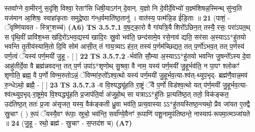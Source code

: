 \documentclass[17pt]{extarticle}
\begin{document}
                  स्तवा᳚ग्ने वा॒मीरनु॑ स॒दृंशि॒ विश्वा॒ रेताꣳ॑सि धिषी॒याऽग॑न् दे॒वान्. य॒ज्ञो नि दे॒वीर्दे॒वेभ्यो॑ य॒ज्ञ्म॑शिषन्न॒स्मिन्थ् सु॑न्व॒ति यज॑मान आ॒शिषः॒ स्वाहा॑कृताः समुद्रे॒ष्ठा ग॑न्ध॒र्वमाति॑ष्ठ॒तानु॑ । वात॑स्य॒ पत्म॑न्नि॒ड ई॑डि॒ताः ॥ \textbf{  21 } \newline
                  \newline
                      (पाशं॒ - ॅवृष्णि॑यावत - स्त्रिꣳ॒॒शच्च॑)  \textbf{(A6)} \newline \newline
                                        \textbf{ TS 3.5.7.1} \newline
                  व॒ष॒ट्का॒रो वै गा॑यत्रि॒यै शिरो᳚ऽछिन॒त् तस्यै॒ रसः॒ परा॑ऽपत॒थ् स पृ॑थि॒वीं प्रावि॑श॒थ्स ख॑दि॒रो॑ऽभव॒द्यस्य॑ खादि॒रः स्रु॒वो भव॑ति॒ छन्द॑सामे॒व रसे॒नाव॑ द्यति॒ सर॑सा अ॒स्याऽऽ*हु॑तयो भवन्ति तृ॒तीय॑स्यामि॒तो दि॒वि सोम॑ आसी॒त् तं गाय॒त्र्याऽ ह॑र॒त् तस्य॑ प॒र्णम॑च्छिद्यत॒ तत् प॒र्णो॑ऽभव॒त् तत् प॒र्णस्य॑ पर्ण॒त्वं ॅयस्य॑ पर्ण॒मयी॑ जु॒हू - [  ] \textbf{  22} \newline
                  \newline
                                \textbf{ TS 3.5.7.2} \newline
                  -र्भव॑ति सौ॒म्या अ॒स्याऽऽ*हु॑तयो भवन्ति जु॒षन्ते᳚ऽस्य दे॒वा आहु॑तीर्दे॒वा वै ब्रह्म॑न्नवदन्त॒ तत् प॒र्ण उपा॑ऽ*शृणोथ् सु॒श्रवा॒ वै नाम॒ यस्य॑ पर्ण॒मयी॑ जु॒हूर्भव॑ति॒ न पा॒पꣳ श्लोकꣳ॑ शृणोति॒ ब्रह्म॒ वै प॒र्णो विण्म॒रुतोऽन्नं॒ ॅविण्मा॑रु॒तो᳚ऽश्व॒त्थो यस्य॑ पर्ण॒मयी॑ जु॒हूर्भव॒त्या-श्व॑त्-थ्युप॒भृद्- ब्रह्म॑णै॒वान्न॒मव॑ रु॒न्धेऽथो॒ ब्रह्मै॒ - [  ] \textbf{  23} \newline
                  \newline
                                \textbf{ TS 3.5.7.3} \newline
                  -व वि॒श्यद्ध्यू॑हति रा॒ष्ट्रं ॅवै प॒र्णो विड॑श्व॒त्थो यत् प॑र्ण॒मयी॑ जु॒हूर्भव॒त्या-श्व॑त्थ्युप॒भृद्-रा॒ष्ट्रमे॒व वि॒श्यद्ध्यू॑हति प्र॒जाप॑ति॒र्वा अ॑जुहो॒थ् सा यत्राऽऽ*हु॑तिः प्र॒त्यति॑ष्ठ॒त् ततो॒ विक॑ङ्कत॒ उद॑तिष्ठ॒त् ततः॑ प्र॒जा अ॑सृजत॒ यस्य॒ वैक॑ङ्कती ध्रु॒वा भव॑ति॒ प्रत्य॒वास्या ऽऽ*हु॑तयस्तिष्ठ॒न्त्यथो॒ प्रैव जा॑यत ए॒तद्वै स्रु॒चाꣳ ( ) रू॒पं ॅयस्यै॒वꣳ रू॑पाः॒ स्रुचो॒ भव॑न्ति॒ सर्वा᳚ण्ये॒वैनꣳ॑ रू॒पाणि॑ पशू॒नामुप॑तिष्ठन्ते॒ नास्याप॑-रूपमा॒त्मञ्जा॑यते ॥ \textbf{  24} \newline
                  \newline
                      (जु॒हू - रथो॒ ब्रह्म॑ - स्रु॒चाꣳ - स॒प्तद॑श च)  \textbf{(A7)} \newline \newline
\end{document}
